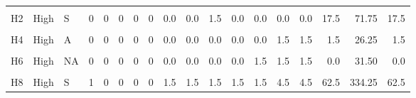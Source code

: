\documentclass[12pt,final,CPage]{ufthesis}
\begin{document}
{\begin{table}
{\begin{tabular}[t]{lllrrrrrrrrrrrrrrr}
  \cellcolor{gray!6}{H1} & \cellcolor{gray!6}{High} & \cellcolor{gray!6}{S?} & \cellcolor{gray!6}{0} & \cellcolor{gray!6}{0} & \cellcolor{gray!6}{0} & \cellcolor{gray!6}{0} & \cellcolor{gray!6}{0} & \cellcolor{gray!6}{0.0} & \cellcolor{gray!6}{0.0} & \cellcolor{gray!6}{0.0} & \cellcolor{gray!6}{1.5} & \cellcolor{gray!6}{0.0} & \cellcolor{gray!6}{4.5} & \cellcolor{gray!6}{4.5} & \cellcolor{gray!6}{1.5} & \cellcolor{gray!6}{78.75} & \cellcolor{gray!6}{1.5}\\
  \addlinespace
  H2 & High & S & 0 & 0 & 0 & 0 & 0 & 0.0 & 0.0 & 1.5 & 0.0 & 0.0 & 0.0 & 0.0 & 17.5 & 71.75 & 17.5\\
  \cellcolor{gray!6}{H3} & \cellcolor{gray!6}{High} & \cellcolor{gray!6}{S} & \cellcolor{gray!6}{0} & \cellcolor{gray!6}{0} & \cellcolor{gray!6}{0} & \cellcolor{gray!6}{0} & \cellcolor{gray!6}{0} & \cellcolor{gray!6}{0.0} & \cellcolor{gray!6}{0.0} & \cellcolor{gray!6}{0.0} & \cellcolor{gray!6}{1.5} & \cellcolor{gray!6}{1.5} & \cellcolor{gray!6}{1.5} & \cellcolor{gray!6}{1.5} & \cellcolor{gray!6}{17.5} & \cellcolor{gray!6}{103.25} & \cellcolor{gray!6}{17.5}\\
  H4 & High & A & 0 & 0 & 0 & 0 & 0 & 0.0 & 0.0 & 0.0 & 0.0 & 0.0 & 1.5 & 1.5 & 1.5 & 26.25 & 1.5\\
  \cellcolor{gray!6}{H5} & \cellcolor{gray!6}{High} & \cellcolor{gray!6}{S} & \cellcolor{gray!6}{0} & \cellcolor{gray!6}{0} & \cellcolor{gray!6}{0} & \cellcolor{gray!6}{0} & \cellcolor{gray!6}{0} & \cellcolor{gray!6}{0.0} & \cellcolor{gray!6}{0.0} & \cellcolor{gray!6}{0.0} & \cellcolor{gray!6}{0.0} & \cellcolor{gray!6}{1.5} & \cellcolor{gray!6}{1.5} & \cellcolor{gray!6}{1.5} & \cellcolor{gray!6}{4.5} & \cellcolor{gray!6}{47.25} & \cellcolor{gray!6}{4.5}\\
  H6 & High & NA & 0 & 0 & 0 & 0 & 0 & 0.0 & 0.0 & 0.0 & 0.0 & 1.5 & 1.5 & 1.5 & 0.0 & 31.50 & 0.0\\
  \addlinespace
  \cellcolor{gray!6}{H7} & \cellcolor{gray!6}{High} & \cellcolor{gray!6}{S} & \cellcolor{gray!6}{0} & \cellcolor{gray!6}{0} & \cellcolor{gray!6}{0} & \cellcolor{gray!6}{0} & \cellcolor{gray!6}{0} & \cellcolor{gray!6}{0.0} & \cellcolor{gray!6}{0.0} & \cellcolor{gray!6}{0.0} & \cellcolor{gray!6}{0.0} & \cellcolor{gray!6}{0.0} & \cellcolor{gray!6}{0.0} & \cellcolor{gray!6}{1.5} & \cellcolor{gray!6}{4.5} & \cellcolor{gray!6}{26.25} & \cellcolor{gray!6}{4.5}\\
  H8 & High & S & 1 & 0 & 0 & 0 & 0 & 1.5 & 1.5 & 1.5 & 1.5 & 1.5 & 4.5 & 4.5 & 62.5 & 334.25 & 62.5\\

\end{tabular}}
\end{table}}
\end{document}
